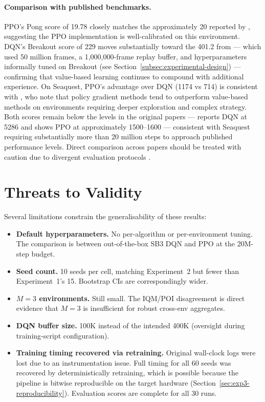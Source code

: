 {\color{red} \paragraph{Comparison with published benchmarks.}
PPO's Pong score of 19.78 closely matches the approximately 20 reported by \citet{schulman2017ppo}, suggesting the PPO implementation is well-calibrated on this environment. DQN's Breakout score of 229 moves substantially toward the 401.2 from \citet{mnih2015human} --- which used 50 million frames, a 1,000,000-frame replay buffer, and hyperparameters informally tuned on Breakout (see Section~\ref{subsec:experimental-design}) --- confirming that value-based learning continues to compound with additional experience. On Seaquest, PPO's advantage over DQN (1174 vs 714) is consistent with \citet{defuente2024comparative}, who note that policy gradient methods tend to outperform value-based methods on environments requiring deeper exploration and complex strategy. Both scores remain below the levels in the original papers --- \citet{mnih2015human} reports DQN at 5286 and \citet{schulman2017ppo} shows PPO at approximately 1500--1600 --- consistent with Seaquest requiring substantially more than 20 million steps to approach published performance levels. Direct comparison across papers should be treated with caution due to divergent evaluation protocols \citep{machado2018revisiting}.}

{\color{red} \section{Threats to Validity}}
\label{sec:exp3-threats}

{\color{red} Several limitations constrain the generalisability of these results:}
\begin{itemize}
  \item \textbf{Default hyperparameters.} No per-algorithm or per-environment tuning. The comparison is between out-of-the-box SB3 DQN and PPO at the 20M-step budget.
  \item \textbf{Seed count.} 10 seeds per cell, matching Experiment~2 but fewer than Experiment~1's 15. Bootstrap CIs are correspondingly wider.
  \item \textbf{$M=3$ environments.} Still small. The IQM/POI disagreement is direct evidence that $M=3$ is insufficient for robust cross-env aggregates.
  \item \textbf{DQN buffer size.} 100K instead of the intended 400K (oversight during training-script configuration).
  \item \textbf{Training timing recovered via retraining.} Original wall-clock logs were lost due to an instrumentation issue. Full timing for all 60 seeds was recovered by deterministically retraining, which is possible because the pipeline is bitwise reproducible on the target hardware (Section~\ref{sec:exp3-reproducibility}). Evaluation scores are complete for all 30 runs.
\end{itemize}

